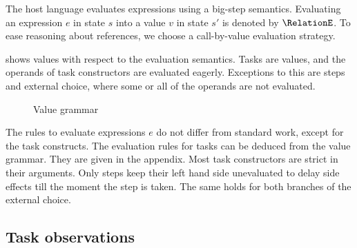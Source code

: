 The host language evaluates expressions using a big-step semantics.
Evaluating an expression $e$ in state $s$ into a value $v$ in state $s'$ is denoted by $\RelationE$.
To ease reasoning about references, we choose a call-by-value evaluation strategy.

 shows values with respect to the evaluation semantics.
Tasks are values, and the operands of task constructors are evaluated eagerly.
Exceptions to this are steps and external choice, where some or all of the operands are not evaluated.

\begin{figure}[h]
  \small
  \caption{Value grammar} \label{fig:value-grammar}
\end{figure}


The rules to evaluate expressions $e$ do not differ from standard work, except for the task constructs.
The evaluation rules for tasks can be deduced from the value grammar.
They are given in the appendix.
Most task constructors are strict in their arguments.
Only steps keep their left hand side unevaluated to delay side effects till the moment the step is taken.
The same holds for both branches of the external choice.

%
%


\subsection{Task observations}


